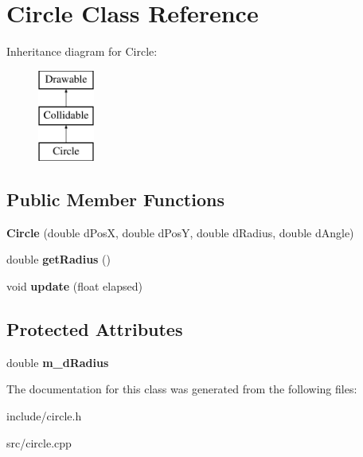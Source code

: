 \hypertarget{class_circle}{}\section{Circle Class Reference}
\label{class_circle}
Inheritance diagram for Circle\+:\begin{figure}[H]
\begin{center}
\leavevmode
\includegraphics[height=3.000000cm]{class_circle}
\end{center}
\end{figure}
\subsection*{Public Member Functions}
\begin{DoxyCompactItemize}
\item 
\hypertarget{class_circle_a37bc287e0f72d8609f64074337cd4a81}{}{\bfseries Circle} (double d\+Pos\+X, double d\+Pos\+Y, double d\+Radius, double d\+Angle)\label{class_circle_a37bc287e0f72d8609f64074337cd4a81}

\item 
\hypertarget{class_circle_af9fccec77d3a15d63594666dc8501437}{}double {\bfseries get\+Radius} ()\label{class_circle_af9fccec77d3a15d63594666dc8501437}

\item 
\hypertarget{class_circle_a06d15da72ba1bbf5c0e98781d44f8da8}{}void {\bfseries update} (float elapsed)\label{class_circle_a06d15da72ba1bbf5c0e98781d44f8da8}

\end{DoxyCompactItemize}
\subsection*{Protected Attributes}
\begin{DoxyCompactItemize}
\item 
\hypertarget{class_circle_a7a3cd116a5a35b05ac342072b74c0fd4}{}double {\bfseries m\+\_\+d\+Radius}\label{class_circle_a7a3cd116a5a35b05ac342072b74c0fd4}

\end{DoxyCompactItemize}


The documentation for this class was generated from the following files\+:\begin{DoxyCompactItemize}
\item 
include/circle.\+h\item 
src/circle.\+cpp\end{DoxyCompactItemize}
